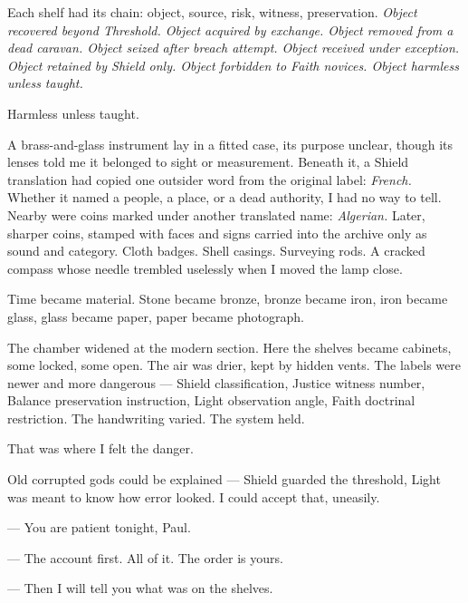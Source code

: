 Each shelf had its chain: object, source, risk, witness, preservation. \textit{Object recovered beyond Threshold. Object acquired by exchange. Object removed from a dead caravan. Object seized after breach attempt. Object received under exception. Object retained by Shield only. Object forbidden to Faith novices. Object harmless unless taught.}\par

Harmless unless taught.\par

A brass-and-glass instrument lay in a fitted case, its purpose unclear, though its lenses told me it belonged to sight or measurement. Beneath it, a Shield translation had copied one outsider word from the original label: \textit{French.} Whether it named a people, a place, or a dead authority, I had no way to tell. Nearby were coins marked under another translated name: \textit{Algerian.} Later, sharper coins, stamped with faces and signs carried into the archive only as sound and category. Cloth badges. Shell casings. Surveying rods. A cracked compass whose needle trembled uselessly when I moved the lamp close.\par

Time became material. Stone became bronze, bronze became iron, iron became glass, glass became paper, paper became photograph.\par

The chamber widened at the modern section. Here the shelves became cabinets, some locked, some open. The air was drier, kept by hidden vents. The labels were newer and more dangerous --- Shield classification, Justice witness number, Balance preservation instruction, Light observation angle, Faith doctrinal restriction. The handwriting varied. The system held.\par

That was where I felt the danger.\par

Old corrupted gods could be explained --- Shield guarded the threshold, Light was meant to know how error looked. I could accept that, uneasily.\par

\ornament

\begin{room}

--- You are patient tonight, Paul.

--- The account first. All of it. The order is yours.

--- Then I will tell you what was on the shelves.

\end{room}

